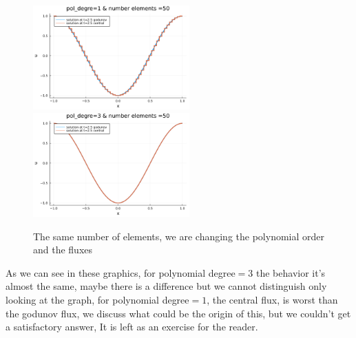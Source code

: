 \documentclass{article}
\begin{document}
	\begin{figure}
		\centering
		\includegraphics[width=6cm]{1,50}
		\includegraphics[width=6cm]{3,50}
		\caption{The same number of elements, we are changing the polynomial order and the fluxes}
	\end{figure}
	As we can see in these graphics, for polynomial degree$=3$ the behavior it's almost the same, maybe there is a difference but we cannot distinguish only looking at the graph, for polynomial degree$=1$, the  central flux, is worst than the godunov flux, we discuss what could be the origin of this, but we couldn't get a satisfactory answer, It is left as an exercise for the reader.
\end{document}
